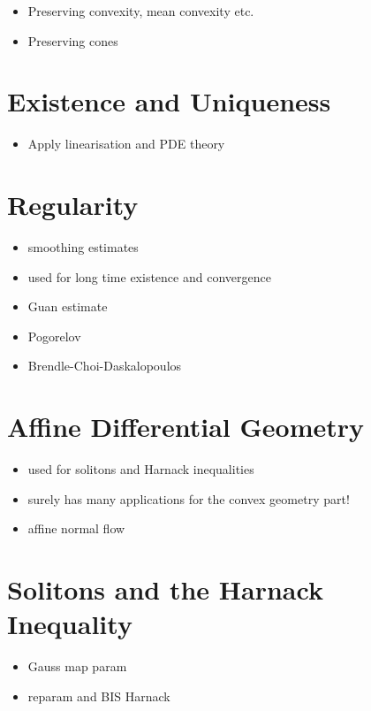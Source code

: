 \begin{itemize}
\item Preserving convexity, mean convexity etc.
\item Preserving cones
\end{itemize}

\section{Existence and Uniqueness}

\begin{itemize}
\item Apply linearisation and PDE theory
\end{itemize}

\section{Regularity}

\begin{itemize}
\item smoothing estimates
\item used for long time existence and convergence
\item Guan estimate
\item Pogorelov
\item Brendle-Choi-Daskalopoulos
\end{itemize}

\section{Affine Differential Geometry}

\begin{itemize}
\item used for solitons and Harnack inequalities
\item surely has many applications for the convex geometry part!
\item affine normal flow
\end{itemize}

\section{Solitons and the Harnack Inequality}

\begin{itemize}
\item Gauss map param
\item reparam and BIS Harnack
\end{itemize}

